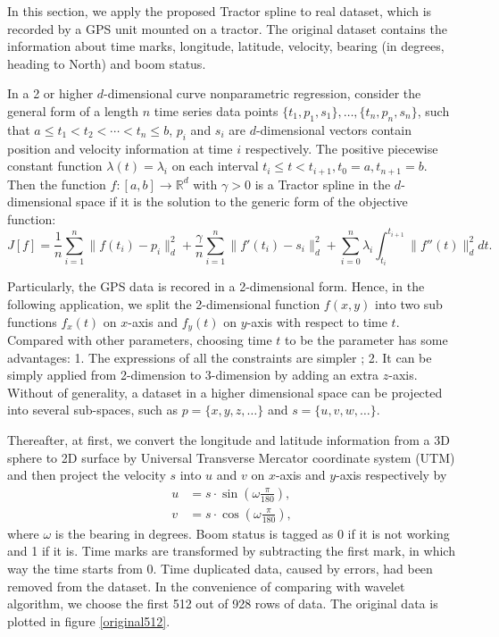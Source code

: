 In this section, we apply the proposed Tractor spline to real dataset, which is recorded by a GPS unit mounted on a tractor. The original dataset contains the information about time marks, longitude, latitude, velocity, bearing (in degrees,  heading to North) and boom status. 

In a 2 or higher $d$-dimensional curve nonparametric regression, consider the general form of a length $n$ time series data points $\{t_1,p_1,s_1\}, \ldots, \{t_n,p_n,s_n\}$, such that $a \leq t_1<t_2< \cdots < t_n \leq b$, $p_i$ and $s_i$ are $d$-dimensional vectors contain position and velocity information at time $i$ respectively. The positive piecewise constant function $\lambda(t) = \lambda_i$ on each interval $t_i \leq t<t_{i+1}, t_0=a, t_{n+1}=b$.  Then the function $f:[a,b]\rightarrow \mathbb{R}^d$ with $\gamma>0$ is a Tractor spline in the $d$-dimensional space if it is the solution to the generic form of the objective function: 
\begin{equation}\label{tractorsplineObjective2D}
J[f]= \frac{1}{n} \sum_{i=1}^{n} \lVert f(t_i)-p_i\rVert_d^2 + \frac{\gamma}{n} \sum_{i=1}^{n} \lVert f'(t_i)-s_i \rVert_d^2 +\sum_{i=0}^{n} \lambda_i\int_{t_i}^{t_{i+1}} \lVert f''(t)\rVert_d^2 dt. 
\end{equation}


Particularly, the GPS data is recored in a 2-dimensional form. Hence, in the following application, we split the 2-dimensional function $f(x,y)$ into two sub functions $f_x(t)$ on $x$-axis and $f_y(t)$ on $y$-axis with respect to time $t$. Compared with other parameters, choosing time $t$ to be the parameter has some advantages: 1. The expressions of all the constraints are simpler \cite{zhang2013cubic}; 2. It can be simply applied from 2-dimension to 3-dimension by adding an extra $z$-axis. Without of generality, a dataset in a higher dimensional space can be projected into several sub-spaces, such as $p=\{x,y,z,\ldots \}$ and $s=\{u,v,w,\ldots \}$. 


Thereafter, at first, we convert the longitude and latitude information from a 3D sphere to 2D surface by Universal Transverse Mercator coordinate system (UTM) and then project the velocity $s$ into $u$ and $v$ on $x$-axis and $y$-axis respectively by 
\begin{align}
u &=s\cdot \sin (\omega\frac{\pi}{180}),\\
v &= s\cdot \cos (\omega\frac{\pi}{180}),
\end{align}
where $\omega$ is the bearing in degrees. Boom status is tagged as 0 if it is not working and 1 if it is. Time marks are transformed by subtracting the first mark, in which way the time starts from 0. Time duplicated data, caused by errors, had been removed from the dataset. In the convenience of comparing with wavelet algorithm, we choose the first 512 out of 928 rows of data. The original data is plotted in figure \ref{original512}.

